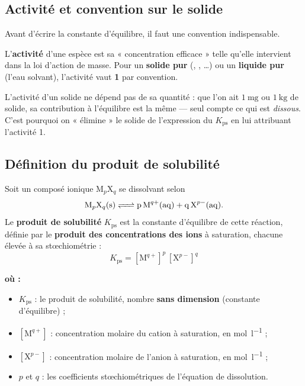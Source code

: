 \documentclass[11pt,a4paper]{article}
\newenvironment{ou}{%
  \par\smallskip\noindent\textbf{où :}\nopagebreak
  \begin{itemize}[leftmargin=1.8em,topsep=2pt,itemsep=1.5pt,parsep=0pt]}%
  {\end{itemize}}
\newcommand{\Kps}{K_{\mathrm{ps}}}
\begin{document}
\subsection{Activité et convention sur le solide}

Avant d'écrire la constante d'équilibre, il faut une convention indispensable.

\begin{definition}
L'\textbf{activité} d'une espèce est sa « concentration efficace » telle qu'elle intervient dans la
loi d'action de masse. Pour un \textbf{solide pur} (, , \dots) ou un
\textbf{liquide pur} (l'eau solvant), l'activité vaut \textbf{1} par convention.
\end{definition}

\begin{remarque}[pourquoi 1 ?]
L'activité d'un solide ne dépend pas de sa quantité : que l'on ait $\qty{1}{\milli\gram}$ ou
$\qty{1}{\kilo\gram}$ de  solide, sa contribution à l'équilibre est la même — seul compte ce
qui est \emph{dissous}. C'est pourquoi on « élimine » le solide de l'expression du $\Kps$ en lui
attribuant l'activité 1.
\end{remarque}

\subsection{Définition du produit de solubilité}

\begin{definition}
Soit un composé ionique $\mathrm{M}_p\mathrm{X}_q$ se dissolvant selon
\[ \ce{M_{p}X_{q}(s) <=> p\,M^{q+}(aq) + q\,X^{p-}(aq)}. \]
Le \textbf{produit de solubilité} $\Kps$ est la constante d'équilibre de cette réaction, définie par
le \textbf{produit des concentrations des ions} à saturation, chacune élevée à sa stœchiométrie :
\[ \boxed{\,\Kps = [\mathrm{M}^{q+}]^{p}\,[\mathrm{X}^{p-}]^{q}\,} \]
\end{definition}

\begin{ou}
  \item $\Kps$ : le produit de solubilité, nombre \textbf{sans dimension} (constante d'équilibre) ;
  \item $[\mathrm{M}^{q+}]$ : concentration molaire du cation à saturation, en \si{\mole\per\litre} ;
  \item $[\mathrm{X}^{p-}]$ : concentration molaire de l'anion à saturation, en \si{\mole\per\litre} ;
  \item $p$ et $q$ : les coefficients stœchiométriques de l'équation de dissolution.
\end{ou}
\end{document}
